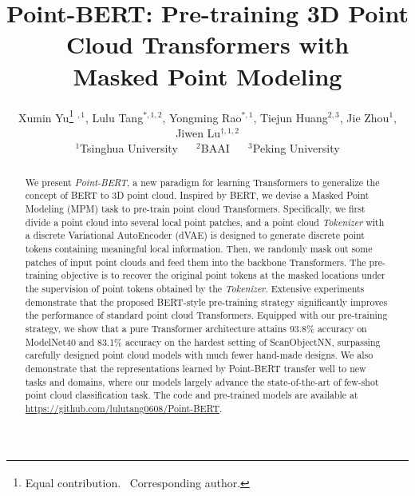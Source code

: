 \documentclass[10pt,twocolumn,letterpaper]{article}
\begin{document}
	
\title{Point-BERT: Pre-training 3D Point Cloud Transformers with \\ Masked Point Modeling}
	
	\author{
	Xumin Yu\thanks{Equal contribution. ~\textsuperscript{\dag}Corresponding author.} $  ^{,1}$,
	Lulu Tang$^{*,1,2}$, 
	Yongming Rao$^{*,1}$, 
	Tiejun Huang$^{2,3}$, 
	Jie Zhou$^{1}$, 
	Jiwen Lu$^{\dagger,1,2}$      \\
    $^1$Tsinghua University ~~	$^2$BAAI ~~  $^3$Peking University  \\
	}
	
	\maketitle
	\begin{abstract}
    We present \textit{Point-BERT}, a new paradigm for learning Transformers to generalize the concept of BERT\cite{bert} to 3D point cloud. Inspired by BERT, we devise a Masked Point Modeling (MPM) task to pre-train point cloud Transformers. Specifically,  we first divide a point cloud into several local point patches, and a point cloud \textit{Tokenizer} with a discrete Variational AutoEncoder (dVAE) is designed to generate discrete point tokens containing meaningful local information. Then, we randomly mask out some patches of input point clouds and feed them into the backbone Transformers. The pre-training objective is to recover the original point tokens at the masked locations under the supervision of point tokens obtained by the \textit{Tokenizer}. Extensive experiments demonstrate that the proposed  BERT-style pre-training strategy significantly improves the performance of standard point cloud Transformers. Equipped with our pre-training strategy, we show that a pure Transformer architecture attains 93.8\% accuracy on ModelNet40 and 83.1\% accuracy on the hardest setting of ScanObjectNN, surpassing carefully designed point cloud models with much fewer hand-made designs. We also demonstrate that the representations learned by Point-BERT transfer well to new tasks and domains, where our models largely advance the state-of-the-art of few-shot point cloud classification task. The code and pre-trained models are available at \url{https://github.com/lulutang0608/Point-BERT}.
	\end{abstract}
	
\end{document}
